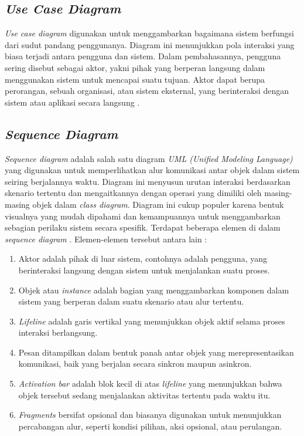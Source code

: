 \subsection{\textit{Use Case Diagram}}
\textit{Use case diagram} digunakan untuk menggambarkan bagaimana sistem berfungsi dari sudut pandang penggunanya. Diagram ini menunjukkan pola interaksi yang biasa terjadi antara pengguna dan sistem. Dalam pembahasannya, pengguna sering disebut sebagai aktor, yakni pihak yang berperan langsung dalam menggunakan sistem untuk mencapai suatu tujuan. Aktor dapat berupa perorangan, sebuah organisasi, atau sistem eksternal, yang berinteraksi dengan sistem atau aplikasi secara langsung \cite{Evi}.

\subsection{\textit{Sequence Diagram}}
\textit{Sequence diagram} adalah salah satu diagram \textit{UML (Unified Modeling Language)} yang digunakan untuk memperlihatkan alur komunikasi antar objek dalam sistem seiring berjalannya waktu. Diagram ini menyusun urutan interaksi berdasarkan skenario tertentu dan mengaitkannya dengan operasi yang dimiliki oleh masing-masing objek dalam \textit{class diagram}. Diagram ini cukup populer karena bentuk visualnya yang mudah dipahami dan kemampuannya untuk menggambarkan sebagian perilaku sistem secara spesifik. Terdapat beberapa elemen di dalam \textit{sequence diagram} \cite{Fedaghi}. Elemen-elemen tersebut antara lain : 
\begin{enumerate}
	\item Aktor adalah pihak di luar sistem, contohnya adalah pengguna, yang berinteraksi langsung dengan sistem untuk menjalankan suatu proses.
	
	\item Objek atau \textit{instance} adalah bagian yang menggambarkan komponen dalam sistem yang berperan dalam suatu skenario atau alur tertentu.
	
	\item \textit{Lifeline} adalah garis vertikal yang menunjukkan objek aktif selama proses interaksi berlangsung.
	
	\item Pesan ditampilkan dalam bentuk panah antar objek yang merepresentasikan komunikasi, baik yang berjalan secara sinkron maupun asinkron.
	
	\item \textit{Activation bar} adalah blok kecil di atas \textit{lifeline} yang menunjukkan bahwa objek tersebut sedang menjalankan aktivitas tertentu pada waktu itu.
	
	\item \textit{Fragments} bersifat opsional dan biasanya digunakan untuk menunjukkan percabangan alur, seperti kondisi pilihan, aksi opsional, atau perulangan.
	
	
	
\end{enumerate}